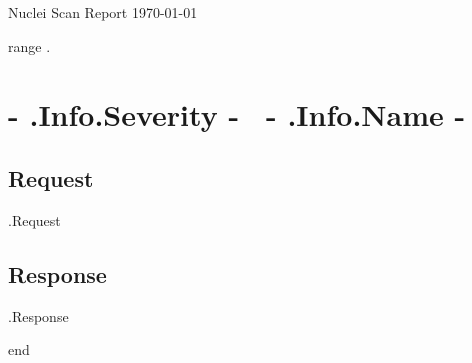 \documentclass{article}
\begin{document}

\begin{titlepage}
\begin{center}
{\huge Nuclei Scan Report}
\vfill
\large{\today}

\end{center}
\end{titlepage}


{{range .}}

	\section{ \colorbox{ {{- .Info.Severity -}} }{ {{- .Info.Severity -}} }~{{- .Info.Name -}} }

	\subsection{Request}

    \begin{Highlighting}
{{.Request}} 
    \end{Highlighting}

    \subsection{Response}
    \begin{Highlighting}
{{.Response}}
    \end{Highlighting}
 
{{end}}

\end{document}
